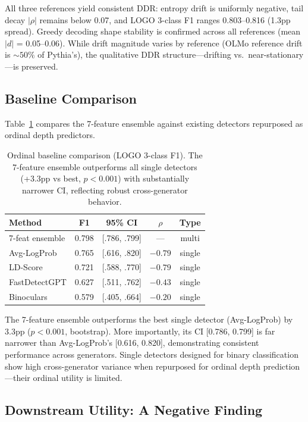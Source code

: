 \documentclass[11pt,a4paper]{article}
\begin{document}
All three references yield consistent DDR: entropy drift is uniformly negative, tail decay $|\rho|$ remains below 0.07, and LOGO 3-class F1 ranges 0.803--0.816 (1.3pp spread). Greedy decoding shape stability is confirmed across all references (mean $|d|$ = 0.05--0.06). While drift magnitude varies by reference (OLMo reference drift is ${\sim}50\%$ of Pythia's), the qualitative DDR structure---drifting vs.\ near-stationary---is preserved.

\subsection{Baseline Comparison}
\label{sec:baselines}

Table~\ref{tab:baselines} compares the 7-feature ensemble against existing detectors repurposed as ordinal depth predictors.

\begin{table}[t]
\centering
\small
\begin{tabular}{lcccc}
\toprule
\textbf{Method} & \textbf{F1} & \textbf{95\% CI} & \textbf{$\rho$} & \textbf{Type} \\
\midrule
7-feat ensemble & 0.798 & [.786, .799] & --- & multi \\
Avg-LogProb & 0.765 & [.616, .820] & $-0.79$ & single \\
LD-Score & 0.721 & [.588, .770] & $-0.79$ & single \\
FastDetectGPT & 0.627 & [.511, .762] & $-0.43$ & single \\
Binoculars & 0.579 & [.405, .664] & $-0.20$ & single \\
\bottomrule
\end{tabular}
\caption{Ordinal baseline comparison (LOGO 3-class F1). The 7-feature ensemble outperforms all single detectors (+3.3pp vs best, $p < 0.001$) with substantially narrower CI, reflecting robust cross-generator behavior.}
\label{tab:baselines}
\end{table}

The 7-feature ensemble outperforms the best single detector (Avg-LogProb) by 3.3pp ($p < 0.001$, bootstrap). More importantly, its CI [0.786, 0.799] is far narrower than Avg-LogProb's [0.616, 0.820], demonstrating consistent performance across generators. Single detectors designed for binary classification show high cross-generator variance when repurposed for ordinal depth prediction---their ordinal utility is limited.

\subsection{Downstream Utility: A Negative Finding}
\label{sec:downstream}
\end{document}
